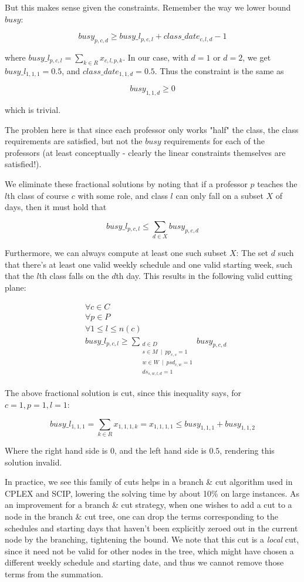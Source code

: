 But this makes sense given the constraints. Remember the way we lower bound $busy$:

$$
busy_{p, c, d} \ge busy\_l_{p, c, l} + class\_date_{c, l, d} - 1
$$

where $busy\_l_{p, c, l} = \sum_{k \in R} x_{c, l, p, k}$. In our case, with $d = 1$ or $d = 2$, we get $busy\_l_{1, 1, 1} = 0.5$, and $class\_date_{1, 1, d} = 0.5$. Thus the constraint is the same as

$$
busy_{1, 1, d} \ge 0
$$

which is trivial.

The problen here is that since each professor only works "half" the class, the class requirements are satisfied, but not the $busy$ requirements for each of the professors (at least conceptually - clearly the linear constraints themselves are satisfied!). 

We eliminate these fractional solutions by noting that if a professor $p$ teaches the $l$th class of course $c$ with some role, and class $l$ can only fall on a subset $X$ of days, then it must hold that

$$
busy\_l_{p, c, l} \le \sum_{d \in X} busy_{p, c, d}
$$

Furthermore, we can always compute at least one such subset $X$: The set $d$ such that there's at least one valid weekly schedule and one valid starting week, such that the $l$th class falls on the $d$th day. This results in the following valid cutting plane:

\begin{align*}
&\forall c \in C\\
&\forall p \in P\\
&\forall 1 \le l \le n(c)\\
&busy\_l_{p, c, l} \ge \sum_{\substack{d \in D \\ s \in M\ \mid\ pp_{c, s} = 1\\ w \in W\ \mid\ psd_{c, w} = 1 \\ ds_{s, w, l, d} = 1}} busy_{p, c, d}
\end{align*}

The above fractional solution is cut, since this inequality says, for $c = 1, p = 1, l = 1$:

$$
busy\_l_{1, 1, 1} = \sum_{k \in R} x_{1, 1, 1, k} = x_{1, 1, 1, 1} \le busy_{1, 1, 1} + busy_{1, 1, 2}
$$

Where the right hand side is $0$, and the left hand side is $0.5$, rendering this solution invalid.

In practice, we see this family of cuts helps in a branch \& cut algorithm used in CPLEX and SCIP, lowering the solving time by about 10\% on large instances. As an improvement for a branch \& cut strategy, when one wishes to add a cut to a node in the branch \& cut tree, one can drop the terms corresponding to the schedules and starting days that haven't been explicitly zeroed out in the current node by the branching, tightening the bound. We note that this cut is a \emph{local} cut, since it need not be valid for other nodes in the tree, which might have chosen a different weekly schedule and starting date, and thus we cannot remove those terms from the summation.

